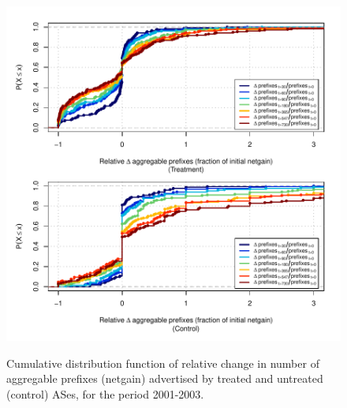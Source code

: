 \clearpage
\vspace*{1.25em}
\begin{figure}[H]
\begin{centering}
\begin{singlespace}
\captionsetup{list=no}
    \includegraphics[width=6in]{figures/behavior-rel_netgain-2001_2003-corr.pdf}
    \vspace{-2em}\\
    \caption{Cumulative distribution function of relative change in number of
    aggregable prefixes (netgain) advertised by treated and untreated (control)
    ASes, for the period 2001-2003.}
\end{singlespace}
\end{centering}
\end{figure}

